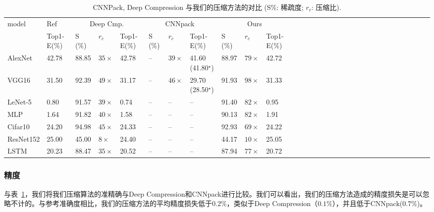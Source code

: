 \begin{table}[h]
\centering
\caption{\footnotesize CNNPack, Deep Compression 与我们的压缩方法的对比 (S\%: 稀疏度; $r_c$: 压缩比).}
\scriptsize
\label{tab:deepratio}
\centering
\begin{tabular}{l@{~~}@{~~}lll@{~~}lll@{~~}lllll@{~~}lll@{~~}lll@{~~}lllll@{~~}lll@{~~}lll@{~~}ll}
\toprule
model 	& Ref 				& \multicolumn{3}{c}{Deep Cmp.~\cite{han2015deep}} 	& \multicolumn{3}{c}{CNNpack~\cite{wang2016cnnpack}} 	& \multicolumn{3}{c}{Ours}				\\
  		& Top1-E(\%) 		& S (\%) & $r_c$ & Top1-E(\%) 	 					& S (\%) & $r_c$ & Top1-E(\%)  	 						&S (\%) & $r_c$ & Top1-E(\%) 		\\
\midrule
AlexNet  	& 42.78			& 88.85	& $35\times$ 	& 42.78 							& --	 &  $39\times$  & 41.60 (41.80$^{\star}$) 				 		& 88.97 & $79\times$	& 42.72				\\
VGG16		& 31.50			& 92.39	& $49\times$ 	& 31.17								& --	 &  $46\times$  & 29.70 (28.50$^{\star}$)							& 91.93  & $98\times$ 	& 31.33				\\
LeNet-5 	& 0.80			& 91.57	& $39\times$ 	& 0.74 								& --	 &  --   & --									& 91.40  & $82\times$ 	& 0.95			 	\\
MLP 		& 1.64			& 91.82	& $40\times$ 	& 1.58								& --  	 &  -- 	 & -- 									& 90.13  & $82\times$ 	& 1.91				\\
Cifar10 	& 24.20			& 94.98	& $45\times$ 	& 24.33								& --	 &  --   & -- 									& 92.93  & $69\times$   & 24.22				\\
ResNet152 	& 25.00			& 45.00 & $8\times$		& 24.40 							& --	 &  --	 & -- 									& 44.17 & $10\times$ 	& 25.05				\\
LSTM 		& 20.23			& 88.47 & $35\times$ 	& 20.52								& --	 &  --   & --									& 87.94	& $77\times$ 	& 20.72				\\
\bottomrule
\end{tabular}
\end{table}

\subsubsection{精度}
与表~\ref{tab:deepratio}，我们将我们压缩算法的准精确与Deep Compression和CNNpack进行比较。我们可以看出，我们的压缩方法造成的精度损失是可以忽略不计的。与参考准确度相比，我们的压缩方法的平均精度损失低于$0.2\%$，类似于Deep Compression（$0.1\%$），并且低于CNNpack($0.7\%$)。

